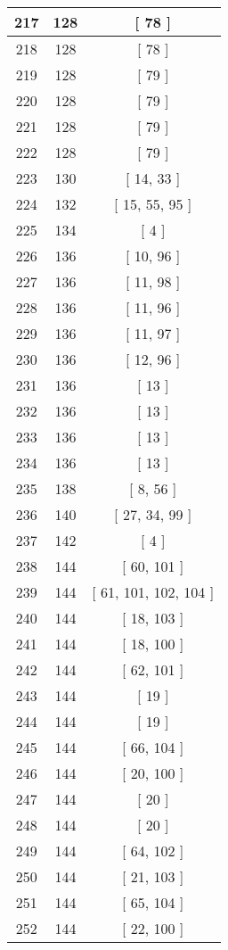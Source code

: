 \begin{center}
\begin{longtable}[H]{|| c c c ||}
\hline
217 & 128 & [ 78 ] \\ 
\hline
218 & 128 & [ 78 ] \\ 
\hline
219 & 128 & [ 79 ] \\ 
\hline
220 & 128 & [ 79 ] \\ 
\hline
221 & 128 & [ 79 ] \\ 
\hline
222 & 128 & [ 79 ] \\ 
\hline
223 & 130 & [ 14, 33 ] \\ 
\hline
224 & 132 & [ 15, 55, 95 ] \\ 
\hline
225 & 134 & [ 4 ] \\ 
\hline
226 & 136 & [ 10, 96 ] \\ 
\hline
227 & 136 & [ 11, 98 ] \\ 
\hline
228 & 136 & [ 11, 96 ] \\ 
\hline
229 & 136 & [ 11, 97 ] \\ 
\hline
230 & 136 & [ 12, 96 ] \\ 
\hline
231 & 136 & [ 13 ] \\ 
\hline
232 & 136 & [ 13 ] \\ 
\hline
233 & 136 & [ 13 ] \\ 
\hline
234 & 136 & [ 13 ] \\ 
\hline
235 & 138 & [ 8, 56 ] \\ 
\hline
236 & 140 & [ 27, 34, 99 ] \\ 
\hline
237 & 142 & [ 4 ] \\ 
\hline
238 & 144 & [ 60, 101 ] \\ 
\hline
239 & 144 & [ 61, 101, 102, 104 ] \\ 
\hline
240 & 144 & [ 18, 103 ] \\ 
\hline
241 & 144 & [ 18, 100 ] \\ 
\hline
242 & 144 & [ 62, 101 ] \\ 
\hline
243 & 144 & [ 19 ] \\ 
\hline
244 & 144 & [ 19 ] \\ 
\hline
245 & 144 & [ 66, 104 ] \\ 
\hline
246 & 144 & [ 20, 100 ] \\ 
\hline
247 & 144 & [ 20 ] \\ 
\hline
248 & 144 & [ 20 ] \\ 
\hline
249 & 144 & [ 64, 102 ] \\ 
\hline
250 & 144 & [ 21, 103 ] \\ 
\hline
251 & 144 & [ 65, 104 ] \\ 
\hline
252 & 144 & [ 22, 100 ] \\ 

\end{longtable}
\end{center}
